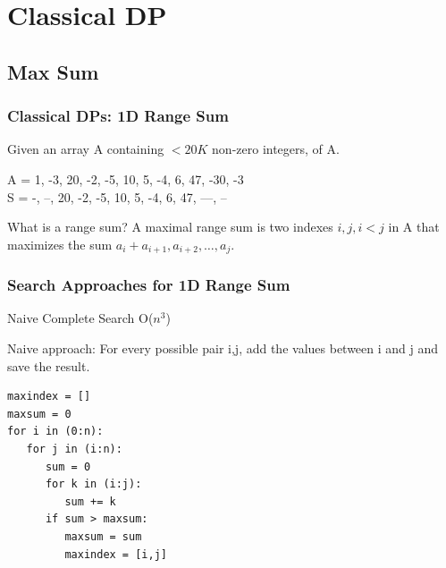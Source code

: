 \documentclass{beamer}
\begin{document}


\section{Classical DP}
\subsection{Max Sum}

\begin{frame}
  \frametitle{Classical DPs: 1D Range Sum}

  Given an array A containing $< 20K$ non-zero integers,
   of A.

  \begin{center}
    A = 1, -3, 20, -2, -5, 10, 5, -4, 6, 47, -30, -3\\
    S = -, --, \alert{20, -2, -5, 10, 5, -4, 6, 47}, ---, --
  \end{center}

  \vfill

  \begin{block}{What is a range sum?}
    A maximal range sum is two indexes $i,j, i < j$ in A that maximizes
    the sum $a_i + a_{i+1}, a_{i+2}, \ldots, a_j$.
  \end{block}
\end{frame}

\begin{frame}[fragile]
  \frametitle{Search Approaches for 1D Range Sum}
  \begin{block}{Naive Complete Search O($n^3$)}

    Naive approach: For every possible pair i,j, add the values
    between i and j and save the result.

{\smaller
\begin{verbatim}
maxindex = []
maxsum = 0
for i in (0:n):
   for j in (i:n):
      sum = 0
      for k in (i:j):
         sum += k
      if sum > maxsum:
         maxsum = sum
         maxindex = [i,j]
\end{verbatim}
}
  \end{block}
\end{frame}
\end{document}
